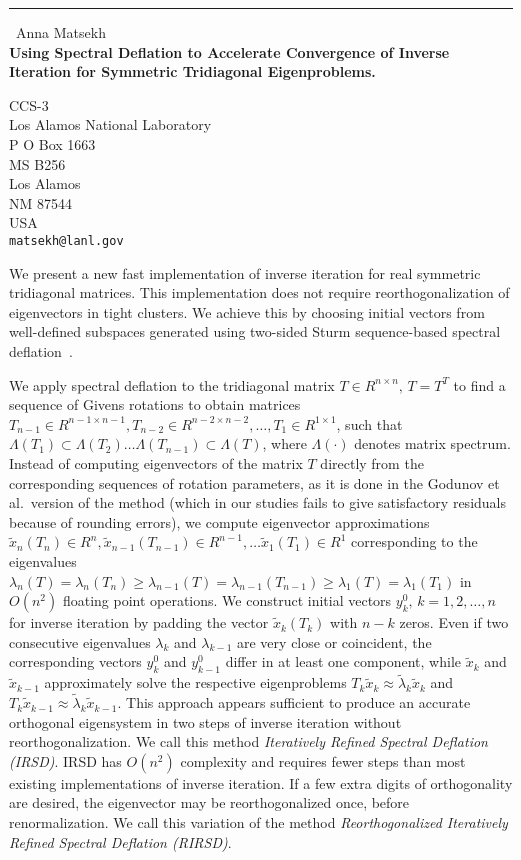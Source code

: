\documentclass{report}
\begin{document}
\begin{center}
\rule{6in}{1pt} \
{\large Anna Matsekh \\
{\bf Using Spectral Deflation to Accelerate Convergence of Inverse Iteration for Symmetric Tridiagonal Eigenproblems.}}

CCS-3 \\ Los Alamos National Laboratory \\ P O Box 1663 \\ MS B256 \\ Los Alamos \\ NM 87544 \\ USA
\\
{\tt matsekh@lanl.gov}\end{center}

We present a new fast implementation of inverse iteration for
real symmetric tridiagonal matrices. This implementation does not
require reorthogonalization of eigenvectors in tight clusters.
We achieve this by choosing initial vectors from well-defined
subspaces generated using two-sided Sturm sequence-based spectral
deflation~\cite{garant:eng}.

We apply spectral deflation to the tridiagonal matrix $T \in
R^{n\times n},\, T = T^T$ to find a sequence of Givens
rotations to obtain matrices $T_{n-1} \in R^{n-1 \times
n-1}, T_{n-2} \in R^{n-2 \times n-2},\ldots, T_{1} \in R^{1\times
1}$, such that $\Lambda(T_{1}) \subset \Lambda(T_{2})\ldots
\Lambda(T_{n-1}) \subset \Lambda(T)$, where $\Lambda(\cdot)$
denotes matrix spectrum. Instead of computing eigenvectors
of the matrix $T$ directly from the corresponding sequences of
rotation parameters, as it is done in the Godunov et al.\
version of the method (which in our studies fails to give
satisfactory residuals because of rounding errors), we compute
eigenvector approximations $\tilde{x}_n(T_n) \in R^{n},
\tilde{x}_{n-1}(T_{n-1}) \in R^{n-1}, \ldots \tilde{x}_1(T_1) \in
R^{1}$ corresponding to the eigenvalues
$\lambda_n(T)=\lambda_n(T_n) \geq
\lambda_{n-1}(T)=\lambda_{n-1}(T_{n-1}) \geq
\lambda_1(T)=\lambda_1(T_1)$ in $O(n^2)$ floating point
operations. We construct initial vectors
${y^0_k},\, k = 1, 2, \ldots, n$ for inverse iteration by padding
the vector $\tilde{x}_k(T_{k})$ with $n-k$ zeros. Even if two
consecutive eigenvalues $\lambda_k$ and $\lambda_{k-1}$ are very
close or coincident, the corresponding vectors ${y^0_k}$ and
${y^0_{k-1}}$ differ in at least one component, while
$\tilde{x}_k$ and $\tilde{x}_{k-1}$ approximately solve the
respective eigenproblems $T_{k} \tilde{x}_{k} \approx
\tilde{\lambda}_{k} \tilde{x}_k$ and $T_{k} \tilde{x}_{k-1}
\approx \tilde{\lambda}_{k} \tilde{x}_{k-1}$. This approach
appears sufficient to produce an accurate orthogonal eigensystem
in two steps of inverse iteration without reorthogonalization. We
call this method \emph{Iteratively Refined Spectral Deflation (IRSD)}.
IRSD has $O(n^2)$ complexity and requires fewer steps than most existing
implementations of
inverse iteration. If a few extra digits of orthogonality are desired, the eigenvector
may be reorthogonalized once, before renormalization.
We call this variation of the method
\emph{Reorthogonalized Iteratively Refined Spectral Deflation (RIRSD)}.
\end{document}
